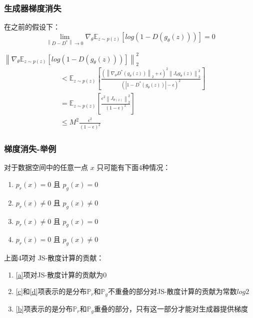 \documentclass[xelatex]{beamer}
\begin{document}
\begin{frame}
\frametitle{生成器梯度消失}
\begin{theorem}
  在之前的假设下：
  $$
  \lim_{\left \| D - D^* \right \| \to 0} {\nabla}_{\theta} \mathbb{E}_{z \sim p(z)} \left [ log(1 - D(g_{\theta}(z))) \right ] = 0
  $$
\end{theorem}
\vspace{5mm}
${\left \| {\nabla}_{\theta} \mathbb{E}_{z \sim p(z)} \left [ log(1 - D(g_{\theta}(z))) \right ] \right \|}_2^2$
\begin{equation*}\begin{split}
& <   \mathbb{E}_{z \sim p(z)} \left [  \frac{\left ( {\left \| \nabla_{\theta}D^*(g_{\theta}(z)) \right \| }_2 + \epsilon  \right )^2 {\left \| J_{\theta}g_{\theta}(z) \right \|}_2^2}{\left ( \left | 1 - D^*(g_{\theta}(z)) \right | - \epsilon  \right  )^2} \right ]    \\
& = \mathbb{E}_{z \sim p(z)} \left [ \frac{{\epsilon }^2 \left \| J_{\theta (z)} \right \|^2_2}{\left ( 1 - \epsilon  \right )^2}  \right ]   \\
& \leq M^2 \frac{\epsilon ^ 2}{(1 - \epsilon)^2}
\end{split}\end{equation*}

\end{frame}

\begin{frame}
  \frametitle{梯度消失-举例}
  \begin{example}[分布的支撑集不重叠导致梯度消失]
    对于数据空间中的任意一点 $x$ 只可能有下面4种情况：
    \begin{enumerate}
      \item $p_{r}(x) = 0$ 且 $p_{g}(x) = 0$ \label{a}
      \item $p_{r}(x) \neq 0$ 且 $p_{g}(x) \neq 0$ \label{b}
      \item $p_{r}(x) \neq 0$ 且 $p_{g}(x) = 0$ \label{c}
      \item $p_{r}(x) = 0$ 且 $p_{g}(x) \neq 0$ \label{d}
    \end{enumerate}
  \end{example}
  上面4项对 JS-散度计算的贡献：
  \begin{enumerate}
    \item \ref{a}项对JS-散度计算的贡献为0
    \item \ref{c}和\ref{d}项表示的是分布$\mathbb{P}_r$和$\mathbb{P}_g$不重叠的部分对JS-散度计算的贡献为常数$log2$
    \item \ref{b}项表示的是分布$\mathbb{P}_r$和$\mathbb{P}_g$重叠的部分，只有这一部分才能对生成器提供梯度
  \end{enumerate}
\end{frame}
\end{document}
